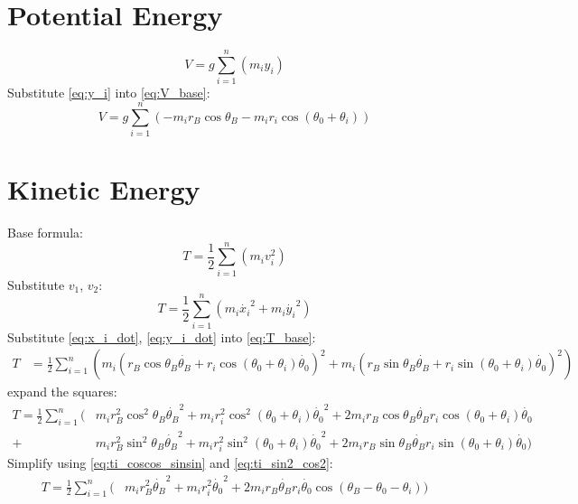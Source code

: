 \documentclass[titlepage]{article}
\numberwithin{equation}{section}
\begin{document}
\section{Potential Energy}
\begin{equation} \label{eq:V_base}
V = g \sum_{i=1}^{n}(m_i y_i)
\end{equation}
Substitute \ref{eq:y_i} into \ref{eq:V_base}:
\begin{equation} \label{eq:V}
V = g \sum_{i=1}^{n}(-m_i r_B \cos \theta_B - m_i r_i \cos{(\theta_0 + \theta_i)})
\end{equation}

\section{Kinetic Energy}
Base formula:
\begin{equation}
T = \frac{1}{2} \sum_{i=1}^{n}(m_i v_i^2)
\end{equation}
Substitute $v_1$, $v_2$:
\begin{equation} \label{eq:T_base}
T = \frac{1}{2} \sum_{i=1}^{n}(m_i \dot{x_i}^2 + m_i \dot{y_i}^2)
\end{equation}
Substitute \ref{eq:x_i_dot}, \ref{eq:y_i_dot} into \ref{eq:T_base}:
\begin{align}
T &= \frac{1}{2} \sum_{i=1}^{n}(
     m_i (r_B \cos \theta_B \dot{\theta_B} 
   + r_i \cos{(\theta_0 + \theta_i)} \dot{\theta_0})^2
   + m_i (r_B \sin \theta_B \dot{\theta_B}
   + r_i \sin{(\theta_0 + \theta_i)} \dot{\theta_0})^2
)
\end{align}
expand the squares:
\begin{align}
T = \frac{1}{2} \sum_{i=1}^{n}(
    &m_i r_B^2 \cos^2 \theta_B \dot{\theta_B}^2
  + m_i r_i^2 \cos^2{(\theta_0 + \theta_i)} \dot{\theta_0}^2
  + 2 m_i r_B \cos \theta_B \dot{\theta_B} r_i \cos{(\theta_0 + \theta_i)} \dot{\theta_0} \nonumber \\
  + &m_i r_B^2 \sin^2 \theta_B \dot{\theta_B}^2
  + m_i r_i^2 \sin^2{(\theta_0 + \theta_i)} \dot{\theta_0}^2
  + 2 m_i r_B \sin \theta_B \dot{\theta_B} r_i \sin{(\theta_0 + \theta_i)} \dot{\theta_0}
)
\end{align}
Simplify using \ref{eq:ti_coscos_sinsin} and \ref{eq:ti_sin2_cos2}:
\begin{align} \label{eq:T}
T = \frac{1}{2} \sum_{i=1}^{n}(
    &m_i r_B^2 \dot{\theta_B}^2
  + m_i r_i^2 \dot{\theta_0}^2
  + 2 m_i r_B \dot{\theta_B} r_i \dot{\theta_0} \cos(\theta_B - \theta_0 - \theta_i)
)
\end{align}
\end{document}
